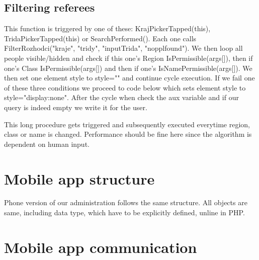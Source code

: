 \subsection{Filtering referees}
This function is triggered by one of these: KrajPickerTapped(this), TridaPickerTapped(this) or SearchPerformed(). Each one calls FilterRozhodci("kraje", "tridy", "inputTrida", "nopplfound"). We then loop all people visible/hidden and check if this one's Region IsPermissible(args[]), then if one's Class IsPermissible(args[]) and then if one's IsNamePermissible(args[]). We then set one element style to style="" and continue cycle execution. If we fail one of these three conditions we proceed to code below which sets element style to style="display:none". After the cycle when check the aux variable and if our query is indeed empty we write it for the user.
\par
This long procedure gets triggered and subsequently executed everytime region, class or name is changed. Performance should be fine here since the algorithm is dependent on human input. 
\section{Mobile app structure}
Phone version of our administration follows the same structure. All objects are same, including data type, which have to be explicitly defined, unline in PHP.
\section{Mobile app communication}

